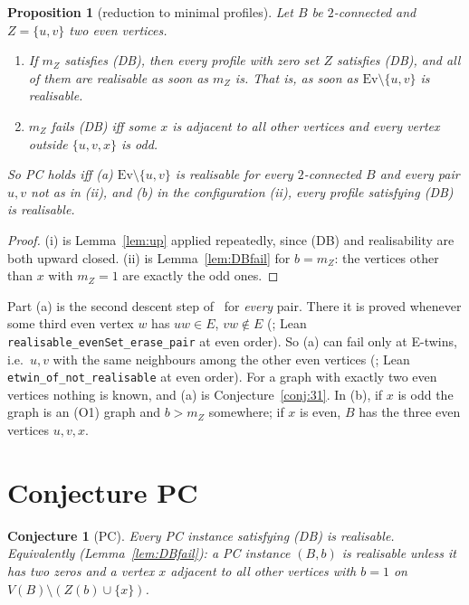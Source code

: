 \documentclass[11pt]{amsart}
\newtheorem{proposition}[theorem]{Proposition}
\newtheorem{conjecture}[theorem]{Conjecture}
\theoremstyle{definition}
\begin{document}
\begin{proposition}[reduction to minimal profiles]\label{prop:min}
Let $B$ be $2$-connected and $Z=\{u,v\}$ two even vertices.
\begin{enumerate}[label=(\roman*)]
\item If $m_Z$ satisfies (DB), then every profile with zero set $Z$ satisfies (DB), and all of them are
realisable as soon as $m_Z$ is. That is, as soon as $\mathrm{Ev}\setminus\{u,v\}$ is realisable.
\item $m_Z$ fails (DB) iff some $x$ is adjacent to all other vertices and every vertex outside
$\{u,v,x\}$ is odd.
\end{enumerate}
So PC holds iff (a) $\mathrm{Ev}\setminus\{u,v\}$ is realisable for every $2$-connected $B$ and every pair
$u,v$ not as in (ii), and (b) in the configuration (ii), every profile satisfying (DB) is realisable.
\end{proposition}
\begin{proof}
(i) is Lemma~\ref{lem:up} applied repeatedly, since (DB) and realisability are both upward closed.
(ii) is Lemma~\ref{lem:DBfail} for $b=m_Z$: the vertices other than $x$ with $m_Z=1$ are exactly the odd
ones.
\end{proof}

Part (a) is the second descent step of~\cite{EP} for \emph{every} pair. There it is proved whenever some
third even vertex $w$ has $uw\in E$, $vw\notin E$ (\cite[Theorem~37]{EP}; Lean
\texttt{realisable\_evenSet\_erase\_pair} at even order). So (a) can fail only at E-twins, i.e.\ $u,v$ with the same
neighbours among the other even vertices (\cite[Corollary~39]{EP}; Lean \texttt{etwin\_of\_not\_realisable} at even order). For a graph with exactly
two even vertices nothing is known, and (a) is Conjecture~\ref{conj:31}. In (b), if $x$ is odd the graph is
an (O1) graph and $b>m_Z$ somewhere; if $x$ is even, $B$ has the three even vertices $u,v,x$.

\section{Conjecture PC}\label{sec:PC}

\begin{conjecture}[PC]\label{conj:PC}
Every PC instance satisfying (DB) is realisable. Equivalently (Lemma~\ref{lem:DBfail}): a PC instance
$(B,b)$ is realisable unless it has two zeros and a vertex $x$ adjacent to all other vertices with $b=1$
on $V(B)\setminus(Z(b)\cup\{x\})$.
\end{conjecture}
\end{document}
